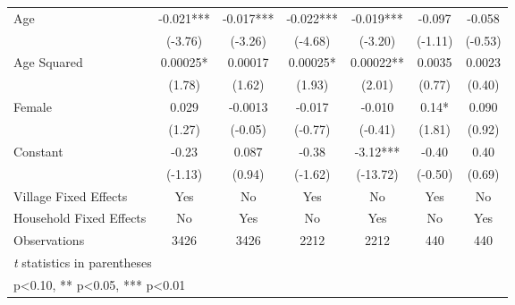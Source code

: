 \begin{table}[htbp]
\begin{tabular}{l*{6}{c}}
Age             &   -0.021***&   -0.017***&   -0.022***&   -0.019***&   -0.097   &   -0.058   \\
                &  (-3.76)   &  (-3.26)   &  (-4.68)   &  (-3.20)   &  (-1.11)   &  (-0.53)   \\
Age Squared     &  0.00025*  &  0.00017   &  0.00025*  &  0.00022** &   0.0035   &   0.0023   \\
                &   (1.78)   &   (1.62)   &   (1.93)   &   (2.01)   &   (0.77)   &   (0.40)   \\
Female          &    0.029   &  -0.0013   &   -0.017   &   -0.010   &     0.14*  &    0.090   \\
                &   (1.27)   &  (-0.05)   &  (-0.77)   &  (-0.41)   &   (1.81)   &   (0.92)   \\
Constant        &    -0.23   &    0.087   &    -0.38   &    -3.12***&    -0.40   &     0.40   \\
                &  (-1.13)   &   (0.94)   &  (-1.62)   & (-13.72)   &  (-0.50)   &   (0.69)   \\
Village Fixed Effects&      Yes   &       No   &      Yes   &       No   &      Yes   &       No   \\
Household Fixed Effects&       No   &      Yes   &       No   &      Yes   &       No   &      Yes   \\
\hline
Observations    &     3426   &     3426   &     2212   &     2212   &      440   &      440   \\
\hline\hline
\multicolumn{7}{l}{\footnotesize \textit{t} statistics in parentheses}\\
\multicolumn{7}{l}{\footnotesize * p<0.10, ** p<0.05, *** p<0.01}\\
\end{tabular}
\end{table}
